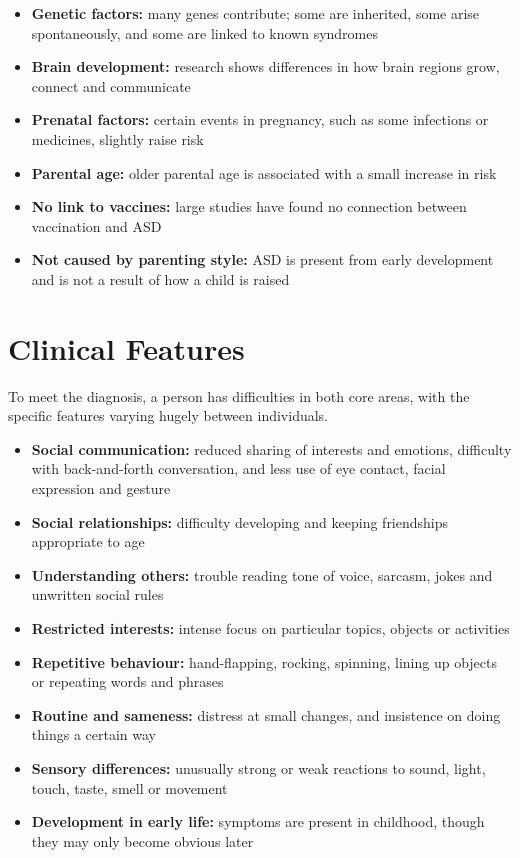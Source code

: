 \begin{itemize}
    \item \textbf{Genetic factors:} many genes contribute; some are inherited, some arise spontaneously, and some are linked to known syndromes
    \item \textbf{Brain development:} research shows differences in how brain regions grow, connect and communicate
    \item \textbf{Prenatal factors:} certain events in pregnancy, such as some infections or medicines, slightly raise risk
    \item \textbf{Parental age:} older parental age is associated with a small increase in risk
    \item \textbf{No link to vaccines:} large studies have found no connection between vaccination and ASD
    \item \textbf{Not caused by parenting style:} ASD is present from early development and is not a result of how a child is raised
\end{itemize}

\section*{Clinical Features}
To meet the diagnosis, a person has difficulties in both core areas, with the specific features varying hugely between individuals.

\begin{itemize}
    \item \textbf{Social communication:} reduced sharing of interests and emotions, difficulty with back-and-forth conversation, and less use of eye contact, facial expression and gesture
    \item \textbf{Social relationships:} difficulty developing and keeping friendships appropriate to age
    \item \textbf{Understanding others:} trouble reading tone of voice, sarcasm, jokes and unwritten social rules
    \item \textbf{Restricted interests:} intense focus on particular topics, objects or activities
    \item \textbf{Repetitive behaviour:} hand-flapping, rocking, spinning, lining up objects or repeating words and phrases
    \item \textbf{Routine and sameness:} distress at small changes, and insistence on doing things a certain way
    \item \textbf{Sensory differences:} unusually strong or weak reactions to sound, light, touch, taste, smell or movement
    \item \textbf{Development in early life:} symptoms are present in childhood, though they may only become obvious later
\end{itemize}


